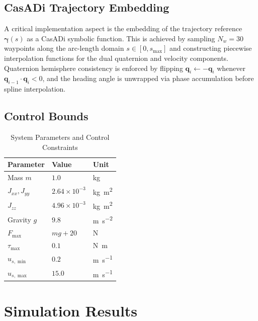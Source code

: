 \documentclass[journal]{IEEEtran}
\begin{document}
\subsection{CasADi Trajectory Embedding}

A critical implementation aspect is the embedding of the trajectory reference $\bm{\gamma}(s)$ as a CasADi symbolic function. This is achieved by sampling $N_w = 30$ waypoints along the arc-length domain $s \in [0, s_{\max}]$ and constructing piecewise interpolation functions for the dual quaternion and velocity components. Quaternion hemisphere consistency is enforced by flipping $\bm{q}_i \leftarrow -\bm{q}_i$ whenever $\bm{q}_{i-1} \cdot \bm{q}_i < 0$, and the heading angle is unwrapped via phase accumulation before spline interpolation.

\subsection{Control Bounds}

\begin{table}[h]
\centering
\caption{System Parameters and Control Constraints}
\label{tab:params}
\begin{tabular}{lll}
\toprule
\textbf{Parameter} & \textbf{Value} & \textbf{Unit} \\
\midrule
Mass $m$             & $1.0$   & \si{\kilogram} \\
$J_{xx}, J_{yy}$    & $2.64 \times 10^{-3}$ & \si{\kilogram\meter\squared} \\
$J_{zz}$            & $4.96 \times 10^{-3}$ & \si{\kilogram\meter\squared} \\
Gravity $g$          & $9.8$   & \si{\meter\per\second\squared} \\
$F_{\max}$           & $mg + 20$ & \si{\newton} \\
$\tau_{\max}$        & $0.1$   & \si{\newton\meter} \\
$u_{s,\min}$         & $0.2$   & \si{\meter\per\second} \\
$u_{s,\max}$         & $15.0$  & \si{\meter\per\second} \\
\bottomrule
\end{tabular}
\end{table}

\section{Simulation Results}
\end{document}
